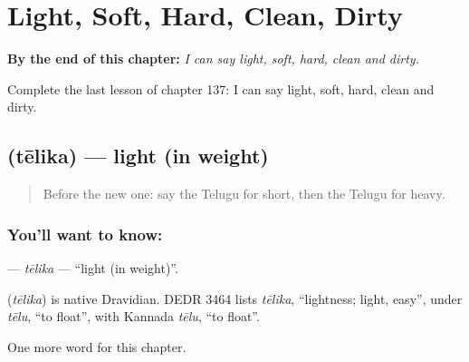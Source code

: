
\chapter{Light, Soft, Hard, Clean, Dirty}
\label{ch:te-light-soft-hard-clean-dirty}

\begin{chapteropening}
\textbf{By the end of this chapter:} \emph{I can say light, soft, hard, clean and dirty.}

Complete the last lesson of chapter 137: I can say light, soft, hard, clean and dirty.
\end{chapteropening}

\section[\texorpdfstring{\te{తేలిక} (tēlika)}{తేలిక (tēlika)}]{ (tēlika) — light (in weight)}

\label{lesson:TE-C137-telika}



\begin{quote}
Before the new one: say the Telugu for short, then the Telugu for heavy.
\end{quote}

\subsection*{You'll want to know: }
\textbf{} — \emph{tēlika} — \textquotedblleft{}light (in weight)\textquotedblright{}.

\begin{cousinweb}
\textbf{} (\emph{tēlika}) is native Dravidian. DEDR 3464 lists \emph{tēlika}, \textquotedblleft{}lightness; light, easy\textquotedblright{}, under \emph{tēlu}, \textquotedblleft{}to float\textquotedblright{}, with Kannada \emph{tēlu}, \textquotedblleft{}to float\textquotedblright{}.
\end{cousinweb}

\begin{grammarlens}[title={What you've built}]
One more word for this chapter.
\end{grammarlens}

